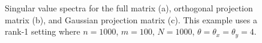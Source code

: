 \begin{figure}
\begin{center}
  \caption{Singular value spectra for the full matrix (a), orthogonal projection matrix
    (b), and Gaussian projection matrix (c). This example uses a rank-1
    setting where $n=1000$, $m=100$, $N=1000$, $\theta=\theta_x=\theta_y=4$.}
  \label{fig:chpt7:motivation1}
\end{center}
\end{figure}

